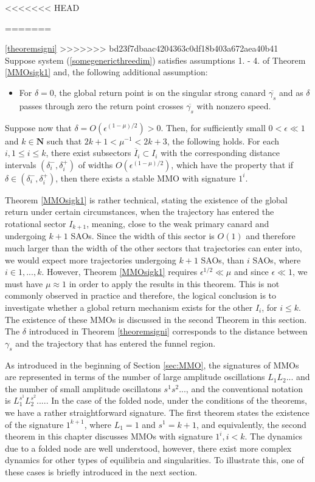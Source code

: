 <<<<<<< HEAD
\begin{theorem}
=======
\begin{theorem} \ref{theoremsigni}
>>>>>>> bd23f7dbaac4204363c0df18b403a672aea40b41
Suppose system (\ref{somegenericthreedim}) satisfies assumptions 1. - 4. of Theorem \ref{MMOsigk1} and, the following additional assumption:
\begin{itemize}
\item For $\delta = 0$, the global return point is on the singular strong canard $\overline{\gamma_s}$ and as $\delta$ passes through zero the return point crosses $\overline{\gamma_s}$ with nonzero speed.
\end{itemize}
Suppose now that $\delta= O(\epsilon ^{(1-\mu)/2})>0$. Then, for sufficiently small $0 < \epsilon \ll 1$ and $k \in \mathbf{N}$ such that $2k+1 < \mu^{-1} < 2k+ 3$, the following holds.
For each $i, 1 \leq i \leq k$, there exist subsectors $\overline{I}_i \subset I_i$ with the corresponding distance intervals $(\delta_i^-, \delta_i^+)$ of widths $O(\epsilon^{(1-\mu)/2})$, which have the property that if $\delta \in (\delta_i^-, \delta_i^+)$, then there exists a stable MMO with signature $1^i$.
\end{theorem}


Theorem \ref{MMOsigk1} is rather technical, stating the existence of the global return under certain circumstances, when the trajectory has entered the rotational sector $I_{k+1}$, meaning, close to the weak primary canard and undergoing $k+1$ SAOs. Since the width of this sector is $O(1)$ and therefore much larger than the width of the other sectors that trajectories can enter into, we would expect more trajectories undergoing $k+1$ SAOs, than $i$ SAOs, where $i \in 1,...,k$.
However, Theorem \ref{MMOsigk1} requires $\epsilon^{1/2} \ll \mu$ and since $\epsilon \ll 1$, we must have $\mu \approx 1$ in order to apply the results in this theorem. This is not commonly observed in practice and therefore, the logical conclusion is to investigate whether a global return mechanism exists for the other $I_i$, for $i \leq k$. The existence of these MMOs is discussed in the second Theorem in this section. The $\delta$ introduced in Theorem \ref{theoremsigni} corresponds to the distance between 
$\gamma_s$ and the trajectory that has entered the funnel region.

As introduced in the beginning of Section \ref{sec:MMO},  the signatures of MMOs are represented in terms of the number of large amplitude oscillations $L_1L_2...$ and the number of small amplitude oscillatons $s^1s^2...$, and the conventional notation is $L_1^{s^1}L_2^{s^2}....$.
In the case of the folded node, under the conditions of the theorems, we have a rather straightforward signature. The first theorem states the existence of the signature $1^{k+1}$, where $L_1=1$ and $s^1=k+1$, and equivalently, the second theorem in this chapter discusses MMOs with signature $1^{i}, i<k$.
The dynamics due to a folded node are well understood, however, there exist more complex dynamics for other types of equilibria and singularities.
To illustrate this, one of these cases is briefly introduced in the next section. 



\end{theorem}
